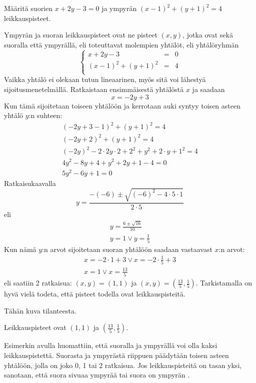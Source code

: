 \begin{esimerkki}
Määritä suorien $x+2y-3=0$ ja ympyrän $(x-1)^2+(y+1)^2=4 $ leikkauspisteet.

\begin{esimratk}

Ympyrän ja suoran leikkauspisteet ovat ne pisteet $(x, y)$, jotka ovat sekä suoralla että ympyrällä, eli toteuttavat molempien yhtälöt, eli yhtälöryhmän
$$\left\{    
    \begin{array}{rcl}
        x+2y-3 &=&0 \\
        (x-1)^2+(y+1)^2 &=&4 \\
    \end{array}
    \right.$$
Vaikka yhtälö ei olekaan tutun lineaarinen, myös sitä voi lähestyä sijoitusmenetelmällä. Ratkaistaan ensimmäisestä yhtälöstä $x$ ja saadaan
\[
x = -2y+3
\]
Kun tämä sijoitetaan toiseen yhtälöön ja kerrotaan auki syntyy toisen asteen yhtälö $y$:n suhteen:
\begin{align*}
(-2y+3-1)^2+(y+1)^2=4 \\
(-2y+2)^2+(y+1)^2=4 \\
(-2y)^2-2\cdot 2y\cdot 2 +2^2+y^2+2\cdot y+1^2=4 \\
4y^2-8y+4+y^2+2y+1-4 = 0 \\
5y^2-6y+1 = 0
\end{align*}
Ratkaisukaavalla
\[
y = \frac{-(-6)\pm\sqrt{(-6)^2-4\cdot 5\cdot 1}}{2\cdot5}
\]
eli
\begin{align*}
y = \frac{6\pm\sqrt{16}}{10} \\
y = 1 \vee y = \frac{1}{5}
\end{align*}
Kun nämä $y$:n arvot sijoitetaan suoran yhtälöön saadaan vastaavast $x$:n arvot:
\begin{align*}
x = -2\cdot 1+3 \vee x = -2\cdot\frac{1}{5}+3 \\
x = 1 \vee x = \frac{13}{5}
\end{align*}
eli saatiin 2 ratkaisua: $(x, y) = (1, 1)$ ja $(x, y) = (\frac{13}{5}, \frac{1}{5})$. Tarkistamalla on hyvä vielä todeta, että pisteet todella ovat leikkauspisteitä.

Tähän kuva tilanteesta.
\begin{esimvast}
Leikkauspisteet ovat $(1, 1)$ ja $(\frac{13}{5}, \frac{1}{5})$.
\end{esimvast}

\end{esimratk}
\end{esimerkki}

Esimerkin avulla huomattiin, että suoralla ja ympyrällä voi olla kaksi leikkauspistettä. Suorasta ja ympyrästä riippuen päädytään toisen asteen yhtälöön, jolla on joko 0, 1 tai 2 ratkaisua. Jos leikkauspisteitä on tasan yksi, sanotaan, että suora sivuaa ympyrää tai suora on ympyrän .


